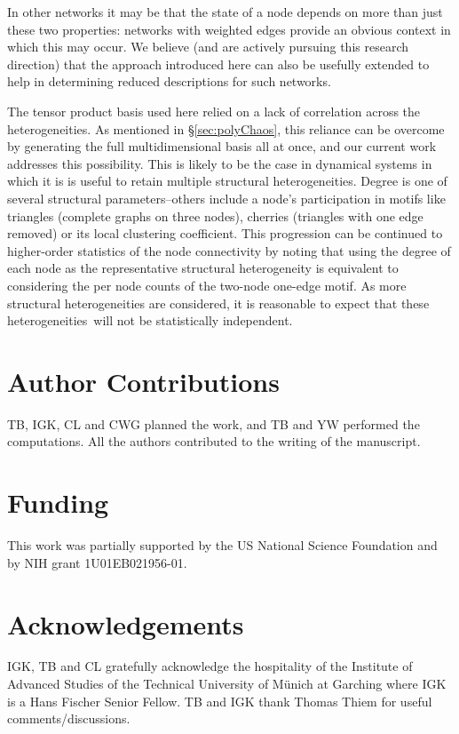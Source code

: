 \documentclass[numbers]{frontiersSCNS}
\newcommand{\secRef}[1]{\S\ref{sec:#1}}
\begin{document}
In other networks
it may be that the state of a node depends on more than just these two properties: networks with weighted
edges provide an obvious context in which this may occur.
%
We believe (and are actively pursuing this research direction) that the
approach introduced here can also be usefully extended to help in determining reduced descriptions
for such networks.


The tensor product basis used here relied on a lack of correlation across the heterogeneities.
%
As mentioned in \secRef{polyChaos}, this reliance can be overcome
by generating the full multidimensional basis all at once,
and our current work addresses this possibility.
%
This is likely to be the case in dynamical systems
in which it is is useful to retain multiple structural heterogeneities.
%
Degree is one of several structural parameters--others include 
a node's participation in motifs like
triangles (complete graphs on three nodes),
cherries (triangles with one edge removed)
or its local clustering coefficient.
%
This progression can be  continued
to higher-order statistics of the node connectivity
by noting that using the degree of each node as the representative structural heterogeneity
is equivalent to considering the per node counts of the two-node one-edge motif.
%
As more structural heterogeneities are considered,
it is reasonable to expect that these heterogeneities\
will not be statistically independent.


\section*{Author Contributions}
TB, IGK, CL and CWG planned the work, and TB and YW performed the computations.
%
All the authors contributed to the writing of the manuscript.


\section*{Funding}
This work was partially supported by the US National Science Foundation and
by NIH grant 1U01EB021956-01.


\section*{Acknowledgements}
IGK, TB and CL gratefully acknowledge the hospitality of the
Institute of Advanced Studies of the Technical University of M{\"u}nich at Garching
where IGK is a Hans Fischer Senior Fellow.
%
TB and IGK thank Thomas Thiem for useful comments/discussions.
\end{document}

